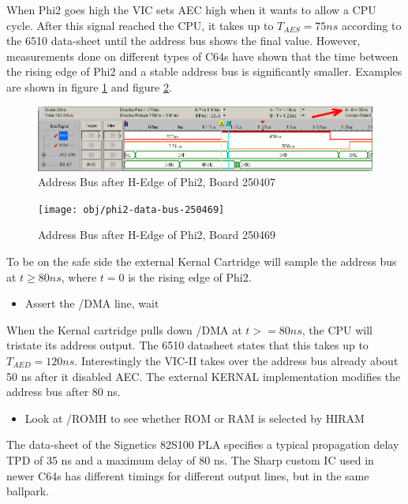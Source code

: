 \documentclass[a4paper,oneside]{memoir}
\begin{document}
When Phi2 goes high the VIC sets AEC high when it wants to allow a
CPU cycle. After this signal reached the CPU, it takes up to $T_{AES} =
75 ns$ according to the 6510 data-sheet until the address bus shows
the final value. However, measurements done on different types of
C64s have shown that the time between the rising edge of Phi2 and a
stable address bus is significantly smaller. Examples are shown in
figure \ref {fig:addr250407} and figure \ref {fig:addr250469}.

\begin{figure}
    \centering
    \includegraphics[width=1.1\textwidth]{src/phi2-data-bus-250407}
    \caption{Address Bus after H-Edge of Phi2, Board 250407}
    \label{fig:addr250407}
\end{figure}

\begin{figure}
    \centering
    \texttt{[image: obj/phi2-data-bus-250469]}
    \caption{Address Bus after H-Edge of Phi2, Board 250469}
    \label{fig:addr250469}
\end{figure}

To be on the safe side the external Kernal Cartridge will sample the
address bus at $t \ge 80 ns$, where $t = 0$ is the rising edge of Phi2.

\begin{itemize}
\item Assert the /DMA line, wait
\end{itemize}

When the Kernal cartridge pulls down /DMA at $t >= 80 ns$, the CPU
will tristate its address output. The 6510 datasheet states that
this takes up to $T_{AED} = 120 ns$. Interestingly the VIC-II takes over
the address bus already about 50 ns after it disabled AEC. The external
KERNAL implementation modifies the address bus after 80 ns.

\begin{itemize}
\item Look at /ROMH to see whether ROM or RAM is selected by HIRAM
\end{itemize}

The data-sheet of the Signetics 82S100 PLA specifies a typical
propagation delay TPD of 35 ns and a maximum delay of 80 ns. The
Sharp custom IC used in newer C64s has different timings for
different output lines, but in the same ballpark.
\end{document}

